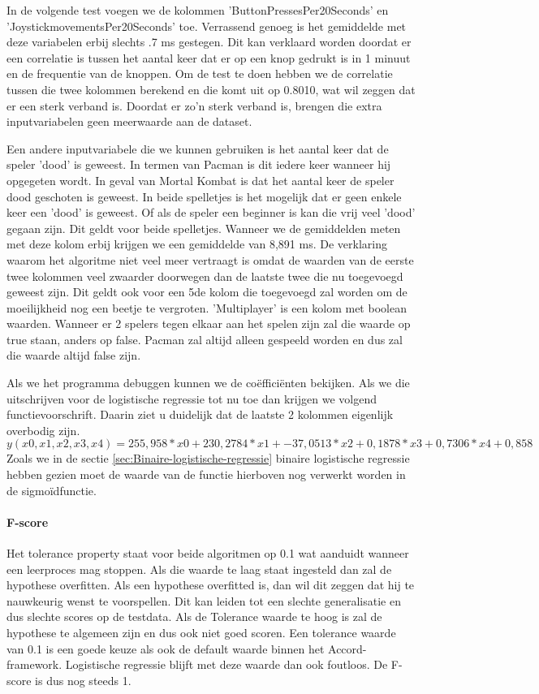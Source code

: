 In de volgende test voegen we de kolommen 'ButtonPressesPer20Seconds' en 'JoystickmovementsPer20Seconds' toe.  Verrassend genoeg is het gemiddelde met deze variabelen erbij slechts .7 ms gestegen. Dit kan verklaard worden doordat er een correlatie is tussen het aantal keer dat er op een knop gedrukt is in 1 minuut en de frequentie van de knoppen. Om de test te doen hebben we de correlatie tussen die twee kolommen berekend en die komt uit op 0.8010, wat wil zeggen dat er een sterk verband is. Doordat er zo'n sterk verband is, brengen die extra inputvariabelen geen meerwaarde aan de dataset. 

Een andere inputvariabele die we kunnen gebruiken is het aantal keer dat de speler 'dood' is geweest. In termen van Pacman is dit iedere keer wanneer hij opgegeten wordt. In geval van Mortal Kombat is dat het aantal keer de speler dood geschoten is geweest. In beide spelletjes is het mogelijk dat er geen enkele keer een 'dood' is geweest. Of als de speler een beginner is kan die vrij veel 'dood' gegaan zijn. Dit geldt voor beide spelletjes.  Wanneer we de gemiddelden meten met deze kolom erbij krijgen we een gemiddelde van 8,891 ms. De verklaring waarom het algoritme niet veel meer vertraagt is omdat de waarden van de eerste twee kolommen veel zwaarder doorwegen dan de laatste twee die nu toegevoegd geweest zijn. Dit geldt ook voor een 5de kolom die toegevoegd zal worden om de moeilijkheid nog een beetje te vergroten.  'Multiplayer' is een kolom met boolean waarden. Wanneer er 2 spelers tegen elkaar aan het spelen zijn zal die waarde op true staan, anders op false. Pacman zal altijd alleen gespeeld worden en dus zal die waarde altijd false zijn.  

Als we het programma debuggen kunnen we de coëfficiënten bekijken. Als we die uitschrijven voor de logistische regressie tot nu toe dan krijgen we volgend functievoorschrift. Daarin ziet u duidelijk dat de laatste 2 kolommen eigenlijk overbodig zijn. 
$$
{y(x0, x1, x2, x3, x4) = 255,958*x0 + 230,2784*x1 + -37,0513*x2 + 0,1878*x3 + 0,7306*x4 + 0,858}
$$
Zoals we in de sectie \ref{sec:Binaire-logistische-regressie} binaire logistische regressie hebben gezien moet de waarde van de functie hierboven nog verwerkt worden in de sigmoïdfunctie. 
 

\paragraph{F-score} 

Het tolerance property staat voor beide algoritmen op 0.1 wat aanduidt wanneer een leerproces mag stoppen. Als die waarde te laag staat ingesteld dan zal de hypothese overfitten. Als een hypothese overfitted is, dan wil dit zeggen dat hij te nauwkeurig wenst te voorspellen. Dit kan leiden tot een slechte generalisatie en dus slechte scores op de testdata. Als de Tolerance waarde te hoog is zal de hypothese te algemeen zijn en dus ook niet goed scoren. Een tolerance waarde van 0.1 is een goede keuze als ook de default waarde binnen het Accord-framework.
Logistische regressie blijft met deze waarde dan ook foutloos. De F-score is dus nog steeds 1.


